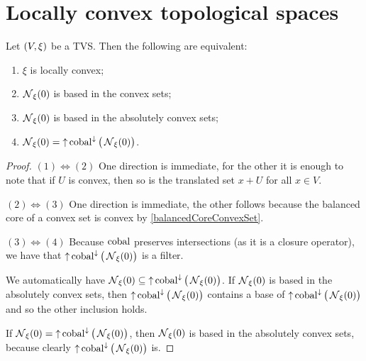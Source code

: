 \section{Locally convex topological spaces}
\begin{lemma} \label{locallyConvexNeighbourhoodsLemma}
Let $\left( V,\xi \right)$ be a TVS. Then the following are equivalent:
\begin{enumerate}
\item $\xi$ is locally convex;
\item $\operatorname{\mathcal{N}}_\xi(0)$ is based in the convex sets;
\item $\operatorname{\mathcal{N}}_\xi(0)$ is based in the absolutely convex sets;
\item $\operatorname{\mathcal{N}}_\xi(0) = \operatorname{\uparrow}\operatorname{cobal}^{\downarrow}\big(\operatorname{\mathcal{N}}_\xi(0)\big)$.
\end{enumerate}
\end{lemma}
\begin{proof}
$(1) \Leftrightarrow (2)$ One direction is immediate, for the other it is enough to note that if $U$ is convex, then so is the translated set $x+U$ for all $x\in V$.

$(2) \Leftrightarrow (3)$ One direction is immediate, the other follows because the balanced core of a convex set is convex by \ref{balancedCoreConvexSet}.

$(3) \Leftrightarrow (4)$ Because $\operatorname{cobal}$ preserves intersections (as it is a closure operator), we have that $\operatorname{\uparrow}\operatorname{cobal}^{\downarrow}\big(\operatorname{\mathcal{N}}_\xi(0)\big)$ is a filter.

We automatically have $\operatorname{\mathcal{N}}_\xi(0) \subseteq \operatorname{\uparrow}\operatorname{cobal}^{\downarrow}\big(\operatorname{\mathcal{N}}_\xi(0)\big)$. If $\operatorname{\mathcal{N}}_\xi(0)$ is based in the absolutely convex sets, then $\operatorname{\uparrow}\operatorname{cobal}^{\downarrow}\big(\operatorname{\mathcal{N}}_\xi(0)\big)$ contains a base of $\operatorname{\uparrow}\operatorname{cobal}^{\downarrow}\big(\operatorname{\mathcal{N}}_\xi(0)\big)$ and so the other inclusion holds.

If $\operatorname{\mathcal{N}}_\xi(0) = \operatorname{\uparrow}\operatorname{cobal}^{\downarrow}\big(\operatorname{\mathcal{N}}_\xi(0)\big)$, then $\operatorname{\mathcal{N}}_\xi(0)$ is based in the absolutely convex sets, because clearly $\operatorname{\uparrow}\operatorname{cobal}^{\downarrow}\big(\operatorname{\mathcal{N}}_\xi(0)\big)$ is.
\end{proof}

